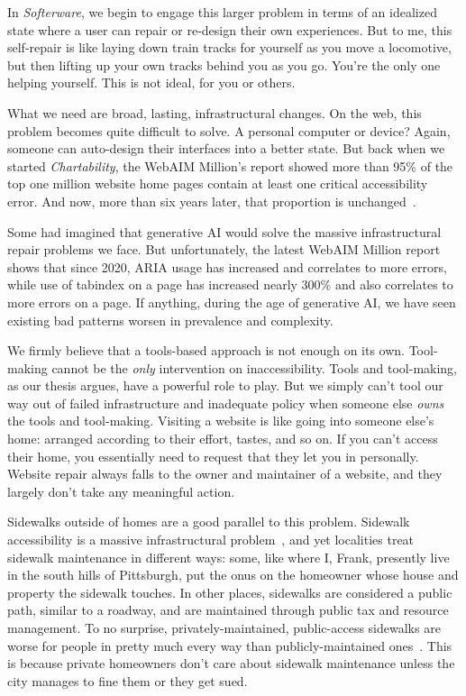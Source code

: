 \documentclass[12pt]{cmuthesis}
\begin{document}
In \textit{Softerware}, we begin to engage this larger problem in terms of an idealized state where a user can repair or re-design their own experiences. But to me, this self-repair is like laying down train tracks for yourself as you move a locomotive, but then lifting up your own tracks behind you as you go. You're the only one helping yourself. This is not ideal, for you or others.

What we need are broad, lasting, infrastructural changes. On the web, this problem becomes quite difficult to solve. A personal computer or device? Again, someone can auto-design their interfaces into a better state. But back when we started \textit{Chartability}, the WebAIM Million's report showed more than 95\% of the top one million website home pages contain at least one critical accessibility error. And now, more than six years later, that proportion is unchanged~\cite{WebAIMWebAIM}.

Some had imagined that generative AI would solve the massive infrastructural repair problems we face. But unfortunately, the latest WebAIM Million report shows that since 2020, ARIA usage has increased and correlates to more errors, while use of tabindex on a page has increased nearly 300\% and also correlates to more errors on a page. If anything, during the age of generative AI, we have seen existing bad patterns worsen in prevalence and complexity.

We firmly believe that a tools-based approach is not enough on its own. Tool-making cannot be the \textit{only} intervention on inaccessibility. Tools and tool-making, as our thesis argues, have a powerful role to play. But we simply can't tool our way out of failed infrastructure and inadequate policy when someone else \textit{owns} the tools and tool-making. Visiting a website is like going into someone else's home: arranged according to their effort, tastes, and so on. If you can't access their home, you essentially need to request that they let you in personally. Website repair always falls to the owner and maintainer of a website, and they largely don't take any meaningful action.

Sidewalks outside of homes are a good parallel to this problem. Sidewalk accessibility is a massive infrastructural problem~\cite{Saha2019}, and yet localities treat sidewalk maintenance in different ways: some, like where I, Frank, presently live in the south hills of Pittsburgh, put the onus on the homeowner whose house and property the sidewalk touches. In other places, sidewalks are considered a public path, similar to a roadway, and are maintained through public tax and resource management. To no surprise, privately-maintained, public-access sidewalks are worse for people in pretty much every way than publicly-maintained ones~\cite{Woldeamanuel2016}. This is because private homeowners don't care about sidewalk maintenance unless the city manages to fine them or they get sued.
\end{document}
